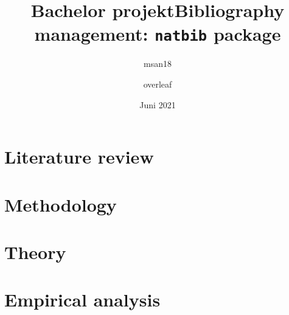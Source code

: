 \documentclass[danish ,a4paper,12pt]{article}
\title{Bachelor projekt}
\author{msan18 }
\date{Juni 2021}
\title{Bibliography management: \texttt{natbib} package}
\author{overleaf}
\date{}
\begin{document}

\linespread{1.5}

\frontmatter






\tableofcontents*	
\newpage


\renewcommand{\cleardoublepage}{\newpage}
\mainmatter


\vspace{1.5 cm}
\selectfont





\section{Literature review} \label{lit_rev}


\section{Methodology} \label{sec:method}


\section{Theory} \label{sec:theory}


\section{Empirical analysis} \label{sec:analysis}

\end{document}
